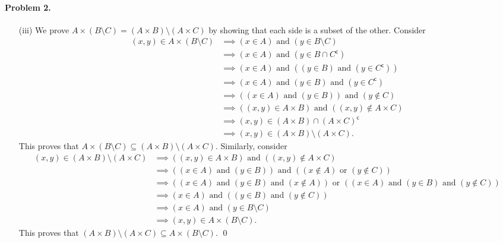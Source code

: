 \documentclass[10pt]{article}
\renewcommand{\land}{\text{ and }}
\renewcommand{\lor}{\text{ or }}
\newcommand{\compl}{\mathsf{c}}
\begin{document}
    \paragraph{Problem 2.}
    \begin{enumerate}
        \item[(iii)] We prove $A \times (B \setminus C) = (A \times B)
        \setminus (A \times C)$ by showing that each side is a subset of the
        other. Consider \begin{align*}
            (x, y) \in A \times (B \setminus C)
            &\implies (x \in A) \land (y \in B\setminus C) \\
            &\implies (x \in A) \land (y \in B \cap C^\compl) \\
            &\implies (x \in A) \land ((y \in B) \land (y \in C^\compl)) \\
            &\implies (x \in A) \land (y \in B) \land (y \in C^\compl) \\
            &\implies ((x \in A) \land (y \in B)) \land (y \notin C) \\
            &\implies ((x, y) \in A\times B) \land ((x, y) \notin A \times C) \\
            &\implies (x, y) \in (A\times B) \cap (A \times C)^\compl \\
            &\implies (x, y) \in (A\times B) \setminus (A \times C).
        \end{align*}
        This proves that $A \times (B \setminus C) \subseteq (A \times B)
        \setminus (A \times C)$. Similarly, consider \begin{align*}
            (x, y) \in (A \times B) \setminus (A \times C)
            &\implies ((x, y) \in A \times B) \land ((x, y) \notin A \times C) \\
            &\implies ((x \in A) \land (y \in B)) \land ((x \notin A) \lor (y \notin C)) \\
            &\implies ((x \in A) \land (y \in B) \land (x \notin A)) \lor
                      ((x \in A) \land (y \in B) \land (y \notin C)) \\
            &\implies (x \in A) \land ((y \in B) \land (y \notin C)) \\
            &\implies (x \in A) \land (y \in B \setminus C) \\
            &\implies (x, y) \in A \times (B \setminus C).
        \end{align*}
        This proves that $(A \times B) \setminus (A \times C) \subseteq A
        \times (B \setminus C)$. \qed



\end{enumerate}
\end{document}
